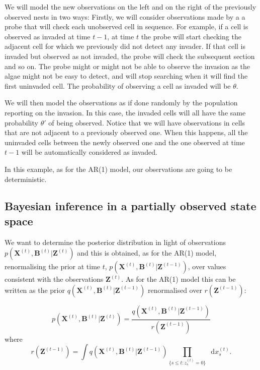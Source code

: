 \documentclass[11pt,a4paper]{article}
\renewcommand{\vec}[1]{\mathbf{#1}}
\newcommand*\diff{\mathop{}\!\mathrm{d}}
\begin{document}
We will model the new observations on the left and on the right of the previously observed nests in two ways: Firstly, we will consider observations made by a a probe that will check each unobserved cell in sequence. For example, if a cell is observed as invaded at time $t-1$, at time $t$ the probe will start checking the adjacent cell for which we previously did not detect any invader. If that cell is invaded but observed as not invaded, the probe will check the subsequent section and so on. The probe might or might not be able to observe the invasion as the algae might not be easy to detect, and will stop searching when it will find the first uninvaded cell. The probability of observing a cell as invaded will be $\theta$.


We will then model the observations as if done randomly by the population reporting on the invasion. In this case, the invaded cells will all have the same probability $\theta'$ of being observed. Notice that we will have observations in cells that are not adjacent to a previously observed one. When this happens, all the uninvaded cells between the newly observed one and the one observed at time $t-1$ will be automatically considered as invaded.

In this example, as for the AR(1) model, our observations are going to be deterministic.

\subsection{Bayesian inference in a partially observed state space}
We want to determine the posterior distribution in light of observations $p(\vec{X}^{(t)}, \vec{B}^{(t)} | \vec{Z}^{(t)})$ and this is obtained, as for the AR(1) model, renormalising the prior at time $t$, $p(\vec{X}^{(t)}, \vec{B}^{(t)} | \vec{Z}^{(t-1)})$, over values consistent with the observations $\vec{Z}^{(t)}$.
As for the AR(1) model this can be written as the prior $q(\vec{X}^{(t)}, \vec{B}^{(t)} | \vec{Z}^{(t-1)})$ renormalised over $r(\vec{Z}^{(t-1)})$:

\[
    p(\vec{X}^{(t)}, \vec{B}^{(t)} | \vec{Z}^{(t)})  =  \frac{q(\vec{X}^{(t)}, \vec{B}^{(t)} | \vec{Z}^{(t-1)})}{r(\vec{Z}^{(t-1)})}
\]
where 
\[
    r(\vec{Z}^{(t-1)}) = \int q(\vec{X}^{(t)}, \vec{B}^{(t)}|\vec{Z}^{(t-1)}) \prod_{\{s \leq t: z_s^{(t)} = 0\}} \diff x_s^{(t)}.
\]
\end{document}
